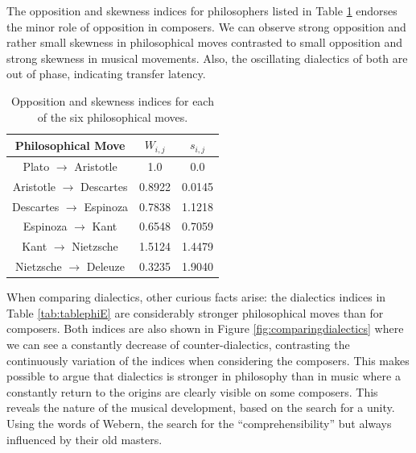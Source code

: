 \documentclass[
 aip,
 jmp,
 amsmath,amssymb,
 reprint,
]{revtex4-1}
\begin{document}
The opposition and skewness indices for philosophers listed in Table
\ref{tab:tablephiOI} endorses the minor role of opposition in
composers. We can observe strong opposition and rather small skewness 
in philosophical moves contrasted to small opposition and strong skewness in
musical movements. Also, the oscillating dialectics of both are out of
phase, indicating transfer latency. 

\begin{table}%
\caption{\label{tab:tablephiOI}Opposition and skewness indices for each
of the six philosophical moves.}

\begin{tabular}{|c||c|c|}
\hline
Philosophical Move & $W_{i,j}$ & $s_{i,j}$ \\
\hline \hline
Plato $\rightarrow$ Aristotle     & 1.0    & 0.0 \\
Aristotle $\rightarrow$ Descartes & 0.8922 & 0.0145 \\
Descartes $\rightarrow$ Espinoza  & 0.7838 & 1.1218 \\
Espinoza $\rightarrow$ Kant       & 0.6548 & 0.7059 \\
Kant $\rightarrow$ Nietzsche      & 1.5124 & 1.4479 \\
Nietzsche $\rightarrow$ Deleuze   & 0.3235 & 1.9040 \\
\hline
\end{tabular}
\end{table}

When comparing dialectics, other curious facts arise: the dialectics
indices in Table \ref{tab:tablephiE} are considerably stronger philosophical moves than for
composers. Both indices are also shown in Figure
\ref{fig:comparingdialectics} where we can see a constantly decrease
of counter-dialectics, contrasting the continuously variation of the
indices when considering the composers. This makes possible to argue
that dialectics is stronger in philosophy than in music where a
constantly return to the origins are clearly visible on some
composers. This reveals the nature of the
musical development, based on the search for a unity. Using the words
of Webern, the search for the ``comprehensibility'' but always
influenced by their old masters.
\end{document}
